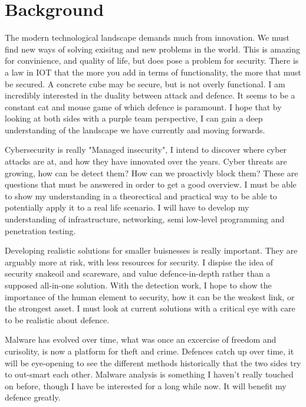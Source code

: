 
\section{Background}
The modern technological landscape demands much from innovation. 
We must find new ways of solving exisitng and new problems in the world. 
This is amazing for convinience, and quality of life, but does pose a problem for security. 
There is a law in IOT that the more you add in terms of functionality, the more that must be secured. 
A concrete cube may be secure, but is not overly functional. I am incredibly interested in the duality between attack and defence. 
It seems to be a constant cat and mouse game of which defence is paramount. 
I hope that by looking at both sides with a purple team perspective, I can gain a deep understanding of the landscape we have currently and moving forwards. 

Cybersecurity is really "Managed insecurity", I intend to discover where cyber attacks are at, and how they have innovated over the years.
Cyber threats are growing, how can be detect them? How can we proactivly block them? These are questions that must be answered in order to get a good overview.
I must be able to show my understanding in a theorectical and practical way to be able to potentially apply it to a real life scenario. 
I will have to develop my understanding of infrastructure, networking, semi low-level programming and penetration testing.

Developing realistic solutions for smaller buisnesses is really important. They are arguably more at risk, with less resources for security. 
I dispise the idea of security snakeoil and scareware, and value defence-in-depth rather than a supposed all-in-one solution.
With the detection work, I hope to show the importance of the human element to security, how it can be the weakest link, or the strongest asset. 
I must look at current solutions with a critical eye with care to be realistic about defence. 

Malware has evolved over time, what was once an excercise of freedom and curisolity, is now a platform for theft and crime. 
Defences catch up over time, it will be eye-opening to see the different methods historically that the two sides try to out-smart each other.
Malware analysis is something I haven't really touched on before, though I have be interested for a long while now. It will benefit my defence greatly.


